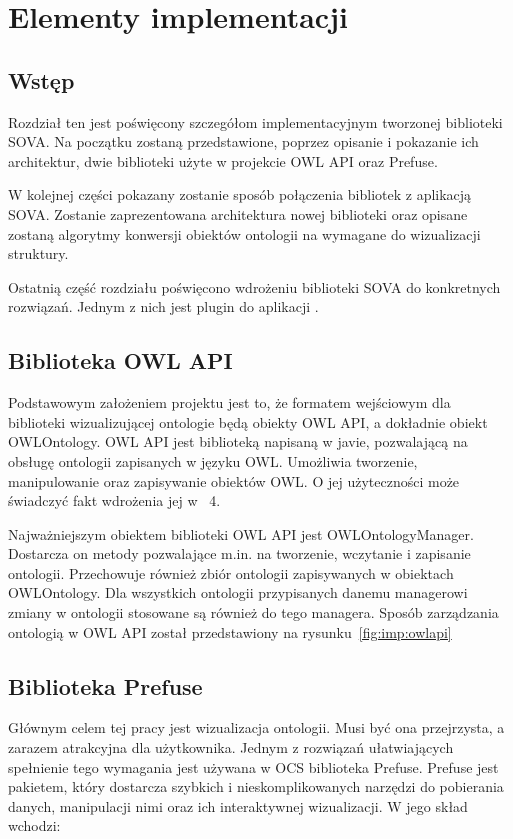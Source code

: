 \chapter{Elementy implementacji}
\section{Wstęp}
Rozdział ten jest poświęcony szczegółom implementacyjnym tworzonej biblioteki SOVA.
Na początku zostaną przedstawione, poprzez opisanie i pokazanie ich architektur, dwie biblioteki użyte w projekcie OWL API oraz Prefuse.

\par 
W kolejnej części pokazany zostanie sposób połączenia bibliotek z aplikacją SOVA. Zostanie zaprezentowana architektura  nowej biblioteki oraz opisane zostaną algorytmy
 konwersji obiektów ontologii na wymagane do wizualizacji struktury.
\par Ostatnią część rozdziału poświęcono wdrożeniu biblioteki SOVA do konkretnych rozwiązań. Jednym z nich jest plugin do aplikacji \protege. 

\section{Biblioteka OWL API}
Podstawowym założeniem projektu jest to, że formatem wejściowym dla biblioteki wizualizującej ontologie będą obiekty OWL API, a dokładnie obiekt OWLOntology. 
OWL API jest biblioteką napisaną w javie, pozwalającą na obsługę ontologii zapisanych w języku OWL. Umożliwia tworzenie, manipulowanie oraz zapisywanie obiektów OWL.
O jej użyteczności może świadczyć fakt wdrożenia jej w \protege~4.
\par Najważniejszym obiektem biblioteki OWL API jest OWLOntologyManager. Dostarcza on metody  pozwalające m.in. na tworzenie, wczytanie i zapisanie ontologii. Przechowuje również zbiór 
ontologii zapisywanych w obiektach OWLOntology. Dla wszystkich ontologii przypisanych danemu managerowi zmiany w ontologii stosowane są również do tego managera. 
Sposób zarządzania ontologią w OWL API został przedstawiony na rysunku~\ref{fig:imp:owlapi}


\section{Biblioteka Prefuse}
Głównym celem tej pracy jest wizualizacja ontologii. Musi być ona przejrzysta, a zarazem atrakcyjna dla użytkownika. Jednym z rozwiązań ułatwiających spełnienie tego wymagania 
jest używana w OCS biblioteka Prefuse. 
Prefuse jest pakietem, który dostarcza szybkich i nieskomplikowanych narzędzi do pobierania danych, manipulacji nimi oraz ich interaktywnej wizualizacji. 
W jego skład wchodzi:

